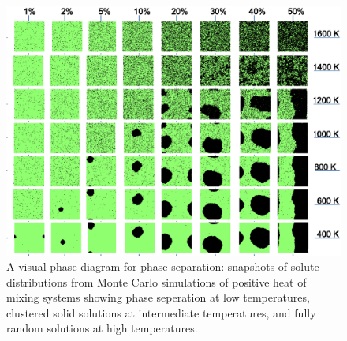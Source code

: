 \documentclass[12pt]{article}
\begin{document}
\begin{figure}[h]
\centering
\includegraphics[width=\textwidth]{regularsolutionsandBraggwilliamsnotes_gr1}
\caption{A visual phase diagram for phase separation: snapshots of solute distributions from Monte Carlo simulations of positive heat of mixing systems showing phase seperation at low temperatures, clustered solid solutions at intermediate temperatures, and fully random solutions at high temperatures.}
\label{RegSolnMC}
\end{figure}
\end{document}
